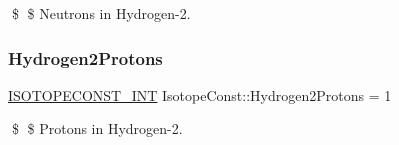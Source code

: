\$ \$ Neutrons in Hydrogen-\/2. \mbox{\label{group___isotope_const-_hydrogen-_h2_ga4f8ca13ab118ec4ebcb431ca4f7cb10d}} 
\subsubsection{\texorpdfstring{Hydrogen2\+Protons}{Hydrogen2Protons}}
{\footnotesize\ttfamily \mbox{\hyperlink{group___isotope_const-_macros_ga5f18360b3e99483a35c32d789e62621c}{I\+S\+O\+T\+O\+P\+E\+C\+O\+N\+S\+T\+\_\+\+I\+NT}} Isotope\+Const\+::\+Hydrogen2\+Protons = 1}

\$ \$ Protons in Hydrogen-\/2. 